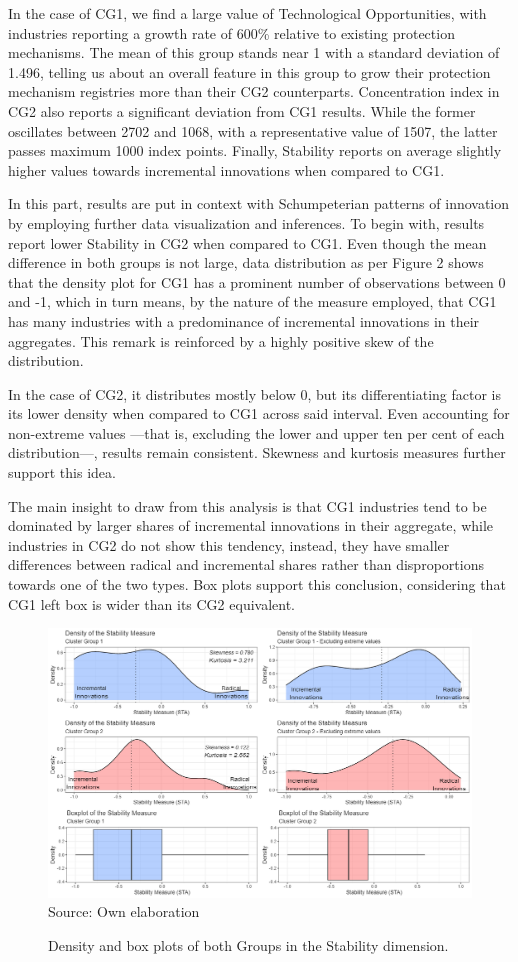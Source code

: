 \documentclass[12pt,a4paper]{article}
\begin{document}
In the case of CG1, we find a large value of Technological Opportunities, with industries reporting a growth rate of 600\% relative to existing protection mechanisms. The mean of this group stands near 1 with a standard deviation of 1.496, telling us about an overall feature in this group to grow their protection mechanism registries more than their CG2 counterparts. Concentration index in CG2 also reports a significant deviation from CG1 results. While the former oscillates between 2702 and 1068, with a representative value of 1507, the latter passes maximum 1000 index points. Finally, Stability reports on average slightly higher values towards incremental innovations when compared to CG1.  

In this part, results are put in context with Schumpeterian patterns of innovation by employing further data visualization and inferences. To begin with, results report lower Stability in CG2 when compared to CG1. Even though the mean difference in both groups is not large, data distribution as per Figure 2 shows that the density plot for CG1 has a prominent number of observations between 0 and -1, which in turn means, by the nature of the measure employed, that CG1 has many industries with a predominance of incremental innovations in their aggregates. This remark is reinforced by a highly positive skew of the distribution. 

In the case of CG2, it distributes mostly below 0, but its differentiating factor is its lower density when compared to CG1 across said interval. Even accounting for non-extreme values —that is, excluding the lower and upper ten per cent of each distribution—, results remain consistent. Skewness and kurtosis measures further support this idea. 

The main insight to draw from this analysis is that CG1 industries tend to be dominated by larger shares of incremental innovations in their aggregate, while industries in CG2 do not show this tendency, instead, they have smaller differences between radical and incremental shares rather than disproportions towards one of the two types. Box plots support this conclusion, considering that CG1 left box is wider than its CG2 equivalent.

\begin{figure}[H]	
	\caption{Density and box plots of both Groups in the Stability dimension.}
	\centering
	\includegraphics[scale = 0.45]{sta.png}
		Source: Own elaboration
\end{figure}
\end{document}
